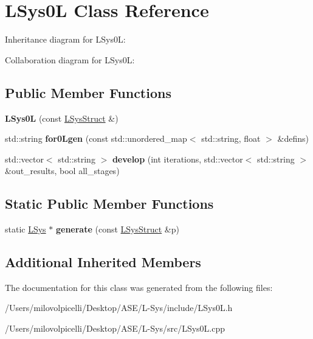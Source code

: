 \hypertarget{class_l_sys0_l}{}\section{L\+Sys0L Class Reference}
\label{class_l_sys0_l}


Inheritance diagram for L\+Sys0L\+:


Collaboration diagram for L\+Sys0L\+:
\subsection*{Public Member Functions}
\begin{DoxyCompactItemize}
\item 
\mbox{\label{class_l_sys0_l_a96f11128eab2db4bae3ac34ddb1ac299}} 
{\bfseries L\+Sys0L} (const \hyperlink{struct_l_sys_struct}{L\+Sys\+Struct} \&)
\item 
\mbox{\label{class_l_sys0_l_a37b8e1a3f90fd2181a1e2f74d18277da}} 
std\+::string {\bfseries for0\+Lgen} (const std\+::unordered\+\_\+map$<$ std\+::string, float $>$ \&defins)
\item 
\mbox{\label{class_l_sys0_l_a1a467dd8fc0ce5f7db1118d39261b6ce}} 
std\+::vector$<$ std\+::string $>$ {\bfseries develop} (int iterations, std\+::vector$<$ std\+::string $>$ \&out\+\_\+results, bool all\+\_\+stages)
\end{DoxyCompactItemize}
\subsection*{Static Public Member Functions}
\begin{DoxyCompactItemize}
\item 
\mbox{\label{class_l_sys0_l_abdd67125ceb1644e3557140fd03f1944}} 
static \hyperlink{class_l_sys}{L\+Sys} $\ast$ {\bfseries generate} (const \hyperlink{struct_l_sys_struct}{L\+Sys\+Struct} \&p)
\end{DoxyCompactItemize}
\subsection*{Additional Inherited Members}


The documentation for this class was generated from the following files\+:\begin{DoxyCompactItemize}
\item 
/\+Users/milovolpicelli/\+Desktop/\+A\+S\+E/\+L-\/\+Sys/include/L\+Sys0\+L.\+h\item 
/\+Users/milovolpicelli/\+Desktop/\+A\+S\+E/\+L-\/\+Sys/src/L\+Sys0\+L.\+cpp\end{DoxyCompactItemize}
